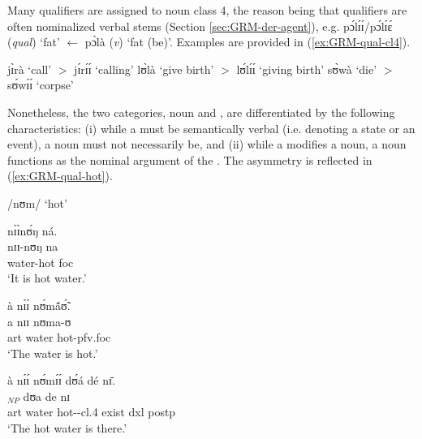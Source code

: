 \begin{exe}
\begin{exe}
\begin{exe}
\begin{exe}
\begin{exe}
\begin{exe}
\begin{exe}
\begin{exe}
\begin{exe}
\z 
 \z
 
 Many qualifiers are assigned to noun class 4, the reason being that qualifiers are often nominalized verbal stems (Section \ref{sec:GRM-der-agent}), e.g. {\sls pɔ́lɪ́ɪ́/pɔ́lɪ́ɛ́} ({\it qual}) `fat' $\leftarrow$ {\sls pɔ̀là}  ({\it v})  `fat (be)'.  Examples are provided in  (\ref{ex:GRM-qual-cl4}).


\ea\label{ex:GRM-qual-cl4}
 
  \ea\label{ex:GRM-qual-cl4-call}
jɪ̀rà  {\rm `call'}  $>$ jɪ́rɪ́ɪ́ {\rm   `calling'}
\ex\label{ex:GRM-qual-cl4-give-birth}
lʊ̀là {\rm  `give birth'} $>$ lʊ́lɪ́ɪ́   {\rm `giving birth'}
\ex\label{ex:GRM-qual-cl4-die}
sʊ̀wà {\rm  `die'} $>$ sʊ́wɪ́ɪ́  {\rm  `corpse'}

  
\z 
 \z


Nonetheless, the two categories, noun and , are differentiated by the following characteristics: (i)  while a  must be semantically verbal (i.e. denoting a state or an event), a noun must not necessarily be, and (ii) while a  modifies a noun,  a  noun functions as  the nominal argument of the . The asymmetry is reflected in (\ref{ex:GRM-qual-hot}).

\ea\label{ex:GRM-qual-hot}{\rm  /nʊm/ `hot'}
 
  \ea\label{ex:GRM-qual-hot-cmp-stem}
  \glll nɪ̀ɪ̀nʊ́ŋ ná.\\
 nɪɪ-nʊŋ na\\
  water-hot {\sc foc}\\
  \glt `It is {\sc hot water}.'

 \ex\label{ex:GRM-qual-hot-head}
  \glll  à nɪ́ɪ́ nʊ́mã́ʊ̃́.\\
 a  nɪɪ nʊma-ʊ\\
   {\sc art} water hot-{\sc pfv.foc}\\
  \glt `The water is {\sc hot}.'

 \ex\label{ex:GRM-qual-hot-qual}
  \glll  à nɪ́ɪ́ nʊ́mɪ́ɪ́ dʊ́á dé nɪ̄.\\
 [a nɪɪ nʊm-ɪ-ɪ]$_{NP}$ dʊa de nɪ \\
  {\sc art} water hot-{\nmlz}-{\sc cl.4} exist {\sc dxl} {\sc postp}\\
  \glt `The hot water is there.'
  
\z 
 \z
 

\end{exe}
\end{exe}
\end{exe}
\end{exe}
\end{exe}
\end{exe}
\end{exe}
\end{exe}
\end{exe}

